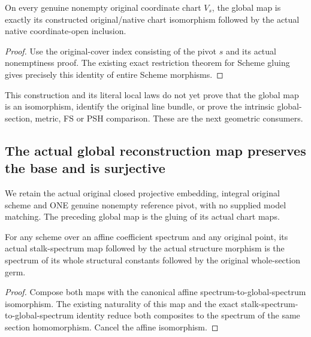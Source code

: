 \begin{theorem}
\label{thm:seven-original-native-global-map-local-route}
\leanok
{}
On every genuine nonempty original coordinate chart $V_s$, the global map
is exactly its constructed original/native chart isomorphism followed by
the actual native coordinate-open inclusion.
\end{theorem}
\begin{proof}
Use the original-cover index consisting of the pivot $s$ and its actual
nonemptiness proof. The existing exact restriction theorem for Scheme
gluing gives precisely this identity of entire Scheme morphisms.
\end{proof}

This construction and its literal local laws do not yet prove that the
global map is an isomorphism, identify the original line bundle, or prove
the intrinsic global-section, metric, FS or PSH comparison. These are the
next geometric consumers.

\subsection{The actual global reconstruction map preserves the base and is surjective}
We retain the actual original closed projective embedding, integral original
scheme and ONE genuine nonempty reference pivot, with no supplied model
matching. The preceding global map is the gluing of its actual chart maps.

\begin{lemma}
\label{lem:seven-actual-generic-structure-whole-constant-route}
\leanok
For any scheme over an affine coefficient spectrum and any original point,
its actual stalk-spectrum map followed by the actual structure morphism is
the spectrum of its whole structural constants followed by the original
whole-section germ.
\end{lemma}
\begin{proof}
Compose both maps with the canonical affine spectrum-to-global-spectrum
isomorphism. The existing naturality of this map and the exact
stalk-spectrum-to-global-spectrum identity reduce both composites to the
spectrum of the same section homomorphism. Cancel the affine isomorphism.
\end{proof}

